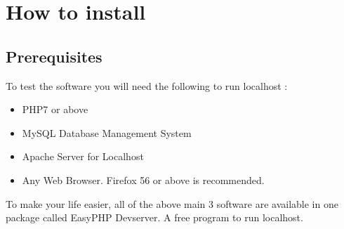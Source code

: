 \documentclass{article}
\begin{document}
\section{How to install}
\subsection{Prerequisites}
To test the software you will need the following to run localhost :
\begin{itemize}
 \item PHP7 or above
 \item MySQL Database Management System
 \item Apache Server for Localhost
 \item Any Web Browser. Firefox 56 or above is recommended.
\end{itemize}
To make your life easier, all of the above main 3 software are available in one package called EasyPHP Devserver. A free program to run localhost.
\end{document}
